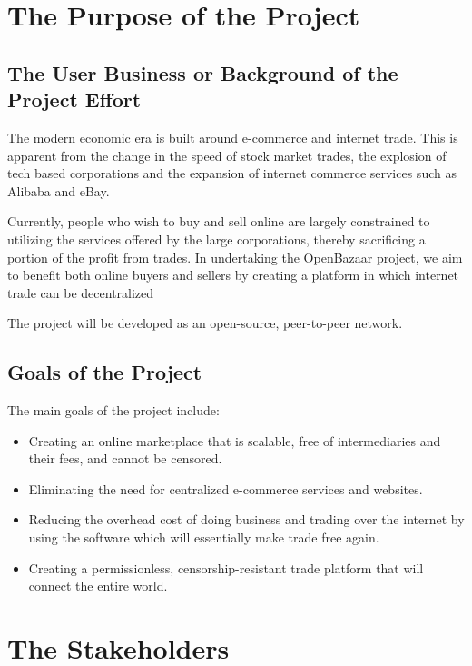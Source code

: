 \documentclass{article}
\begin{document}
\section{The Purpose of the Project}

\subsection{The User Business or Background of the Project Effort}

The modern economic era is built around e-commerce and internet trade. This is apparent from the change in the speed of stock market trades, the explosion of tech based corporations and the expansion of internet commerce services such as Alibaba and eBay.

Currently, people who wish to buy and sell online are largely constrained to utilizing the services offered by the large corporations, thereby sacrificing a portion of the profit from trades. In undertaking the OpenBazaar project, we aim to benefit both online buyers and sellers by creating a platform in which internet trade can be decentralized


The project will be developed as an open-source, peer-to-peer network. 


\subsection{Goals of the Project}
The main goals of the project include:

\begin{itemize}

\item
Creating an online marketplace that is scalable, free of intermediaries and their fees, and cannot be censored.

\item
Eliminating the need for centralized e-commerce services and websites.

\item
Reducing the overhead cost of doing business and trading over the internet by using the software which will essentially make trade free again.

\item
Creating a permissionless, censorship-resistant trade platform that will connect the entire world.
\end{itemize}

\section{The Stakeholders}
\end{document}
